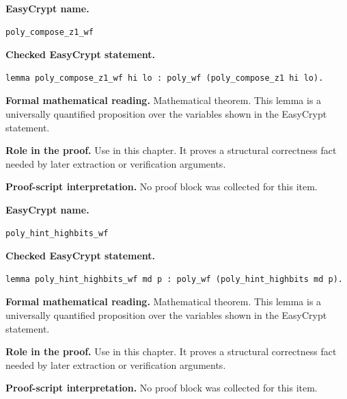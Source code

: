 \begin{formaltheorem}
\noindent\textbf{EasyCrypt name.}
\begin{lstlisting}[language=EasyCrypt,basicstyle=\ttfamily\scriptsize]
poly_compose_z1_wf
\end{lstlisting}
\noindent\textbf{Checked EasyCrypt statement.}
\begin{lstlisting}[language=EasyCrypt,basicstyle=\ttfamily\scriptsize]
lemma poly_compose_z1_wf hi lo : poly_wf (poly_compose_z1 hi lo).
\end{lstlisting}
\noindent\textbf{Formal mathematical reading.}
Mathematical theorem. This lemma is a universally quantified proposition over the variables shown in the EasyCrypt statement.

\noindent\textbf{Role in the proof.}
Use in this chapter. It proves a structural correctness fact needed by later extraction or verification arguments.

\noindent\textbf{Proof-script interpretation.}
No proof block was collected for this item.

\end{formaltheorem}

\begin{formaltheorem}
\noindent\textbf{EasyCrypt name.}
\begin{lstlisting}[language=EasyCrypt,basicstyle=\ttfamily\scriptsize]
poly_hint_highbits_wf
\end{lstlisting}
\noindent\textbf{Checked EasyCrypt statement.}
\begin{lstlisting}[language=EasyCrypt,basicstyle=\ttfamily\scriptsize]
lemma poly_hint_highbits_wf md p : poly_wf (poly_hint_highbits md p).
\end{lstlisting}
\noindent\textbf{Formal mathematical reading.}
Mathematical theorem. This lemma is a universally quantified proposition over the variables shown in the EasyCrypt statement.

\noindent\textbf{Role in the proof.}
Use in this chapter. It proves a structural correctness fact needed by later extraction or verification arguments.

\noindent\textbf{Proof-script interpretation.}
No proof block was collected for this item.

\end{formaltheorem}

